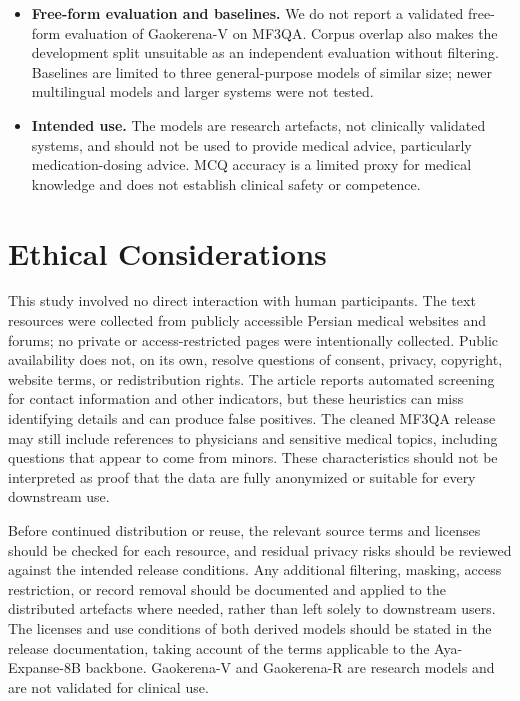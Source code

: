 \documentclass[manuscript,screen,review]{acmart}
\begin{document}
\begin{itemize}
\item \textbf{Free-form evaluation and baselines.} We do not report a validated free-form evaluation of Gaokerena-V on MF3QA. Corpus overlap also makes the development split unsuitable as an independent evaluation without filtering. Baselines are limited to three general-purpose models of similar size; newer multilingual models and larger systems were not tested.
\item \textbf{Intended use.} The models are research artefacts, not clinically validated systems, and should not be used to provide medical advice, particularly medication-dosing advice. MCQ accuracy is a limited proxy for medical knowledge and does not establish clinical safety or competence.
\end{itemize}

\section{Ethical Considerations}\label{sec:ethics}

This study involved no direct interaction with human participants. The text resources were collected from publicly accessible Persian medical websites and forums; no private or access-restricted pages were intentionally collected. Public availability does not, on its own, resolve questions of consent, privacy, copyright, website terms, or redistribution rights. The article reports automated screening for contact information and other indicators, but these heuristics can miss identifying details and can produce false positives. The cleaned MF3QA release may still include references to physicians and sensitive medical topics, including questions that appear to come from minors. These characteristics should not be interpreted as proof that the data are fully anonymized or suitable for every downstream use.

Before continued distribution or reuse, the relevant source terms and licenses should be checked for each resource, and residual privacy risks should be reviewed against the intended release conditions. Any additional filtering, masking, access restriction, or record removal should be documented and applied to the distributed artefacts where needed, rather than left solely to downstream users. The licenses and use conditions of both derived models should be stated in the release documentation, taking account of the terms applicable to the Aya-Expanse-8B backbone. Gaokerena-V and Gaokerena-R are research models and are not validated for clinical use.
\end{document}
